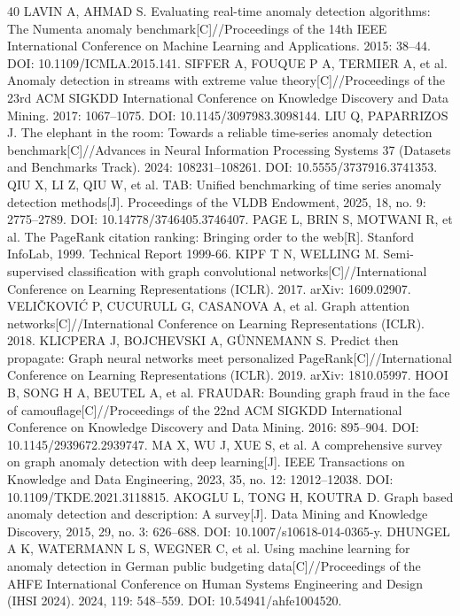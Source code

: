 \documentclass[a4paper,fleqn]{cas-dc}
\begin{document}
\begin{thebibliography}{40}
 LAVIN A, AHMAD S. Evaluating real-time anomaly detection algorithms: The Numenta anomaly benchmark[C]//Proceedings of the 14th IEEE International Conference on Machine Learning and Applications. 2015: 38–44. DOI: 10.1109/ICMLA.2015.141.
 SIFFER A, FOUQUE P A, TERMIER A, et al. Anomaly detection in streams with extreme value theory[C]//Proceedings of the 23rd ACM SIGKDD International Conference on Knowledge Discovery and Data Mining. 2017: 1067–1075. DOI: 10.1145/3097983.3098144.
 LIU Q, PAPARRIZOS J. The elephant in the room: Towards a reliable time-series anomaly detection benchmark[C]//Advances in Neural Information Processing Systems 37 (Datasets and Benchmarks Track). 2024: 108231–108261. DOI: 10.5555/3737916.3741353.
 QIU X, LI Z, QIU W, et al. TAB: Unified benchmarking of time series anomaly detection methods[J]. Proceedings of the VLDB Endowment, 2025, 18, no. 9: 2775–2789. DOI: 10.14778/3746405.3746407.
 PAGE L, BRIN S, MOTWANI R, et al. The PageRank citation ranking: Bringing order to the web[R]. Stanford InfoLab, 1999. Technical Report 1999-66.
 KIPF T N, WELLING M. Semi-supervised classification with graph convolutional networks[C]//International Conference on Learning Representations (ICLR). 2017. arXiv: 1609.02907.
 VELIČKOVIĆ P, CUCURULL G, CASANOVA A, et al. Graph attention networks[C]//International Conference on Learning Representations (ICLR). 2018.
 KLICPERA J, BOJCHEVSKI A, GÜNNEMANN S. Predict then propagate: Graph neural networks meet personalized PageRank[C]//International Conference on Learning Representations (ICLR). 2019. arXiv: 1810.05997.
 HOOI B, SONG H A, BEUTEL A, et al. FRAUDAR: Bounding graph fraud in the face of camouflage[C]//Proceedings of the 22nd ACM SIGKDD International Conference on Knowledge Discovery and Data Mining. 2016: 895–904. DOI: 10.1145/2939672.2939747.
 MA X, WU J, XUE S, et al. A comprehensive survey on graph anomaly detection with deep learning[J]. IEEE Transactions on Knowledge and Data Engineering, 2023, 35, no. 12: 12012–12038. DOI: 10.1109/TKDE.2021.3118815.
 AKOGLU L, TONG H, KOUTRA D. Graph based anomaly detection and description: A survey[J]. Data Mining and Knowledge Discovery, 2015, 29, no. 3: 626–688. DOI: 10.1007/s10618-014-0365-y.
 DHUNGEL A K, WATERMANN L S, WEGNER C, et al. Using machine learning for anomaly detection in German public budgeting data[C]//Proceedings of the AHFE International Conference on Human Systems Engineering and Design (IHSI 2024). 2024, 119: 548–559. DOI: 10.54941/ahfe1004520.

\end{thebibliography}
\end{document}
